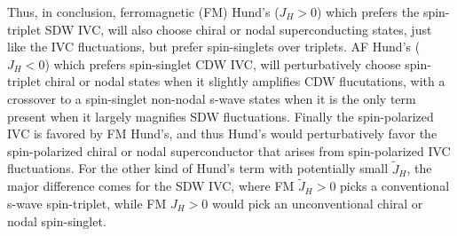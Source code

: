 \documentclass[aps,pra,twocolumn,superscriptaddress,10pt,article,nofootinbib,showpacs,longbibliography]{revtex4-1}
\begin{document}
Thus, in conclusion, ferromagnetic (FM) Hund's ($J_H > 0$) which prefers the spin-triplet SDW IVC, will also choose chiral or nodal superconducting states, just like the IVC fluctuations, but prefer spin-singlets over triplets. 
AF Hund's ($J_H < 0$) which prefers spin-singlet CDW IVC, will perturbatively choose spin-triplet chiral or nodal states when it slightly amplifies CDW flucutations, with a crossover to a spin-singlet non-nodal s-wave states when it is the only term present when it largely magnifies SDW fluctuations.
Finally the spin-polarized IVC is favored by FM Hund's, and thus Hund's would perturbatively favor the spin-polarized chiral or nodal superconductor that arises from spin-polarized IVC fluctuations. 
For the other kind of Hund's term with potentially small $\tilde{J}_H$, the major difference comes for the SDW IVC, where FM $\tilde{J}_H > 0$ picks a conventional s-wave spin-triplet, while FM $J_H > 0$ would pick an unconventional chiral or nodal spin-singlet.
\end{document}
